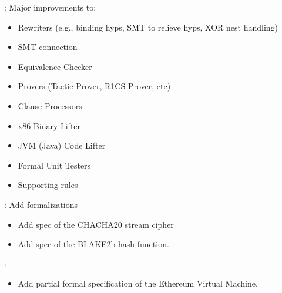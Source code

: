 
\begin{frame}

\implibtitle

: Major improvements to:
\begin{itemize}
\item Rewriters (e.g., binding hyps, SMT to relieve hyps, XOR nest handling)
\item SMT connection
\item Equivalence Checker
\item Provers (Tactic Prover, R1CS Prover, etc)
\item Clause Processors
\item x86 Binary Lifter
\item JVM (Java) Code Lifter
\item Formal Unit Testers
\item Supporting rules
\end{itemize}

\end{frame}


\begin{frame}

\implibtitle

: Add formalizations
\begin{itemize}
\item Add spec of the CHACHA20 stream cipher
\item Add spec of the BLAKE2b hash function.
\end{itemize}

\end{frame}


\begin{frame}

\implibtitle

:
\begin{itemize}
\item Add partial formal specification of the Ethereum Virtual Machine.
\end{itemize}

\end{frame}

